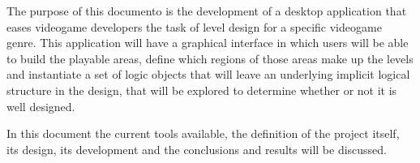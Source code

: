 The purpose of this documento is the development of a desktop application that eases videogame developers the task of level design for a specific videogame genre. This application will have a graphical interface in which users will be able to build the playable areas, define which regions of those areas make up the levels and instantiate a set of logic objects that will leave an underlying implicit logical structure in the design, that will be explored to determine whether or not it is well designed.

In this document the current tools available, the definition of the project itself, its design, its development and the conclusions and results will be discussed.


